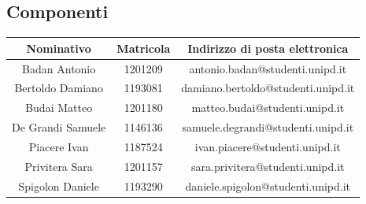 \subsection{Componenti}
\begin{table}[H]
	\centering
	\renewcommand{\arraystretch}{1.5}
	\begin{tabular}{|c|c|c|}
		\hline
		\rowcolor{lighter-grayer}
		Nominativo & Matricola & Indirizzo di posta elettronica \\
		\hline
		Badan Antonio & 1201209 & antonio.badan@studenti.unipd.it\\
		\hline
		Bertoldo Damiano & 1193081 & damiano.bertoldo@studenti.unipd.it \\
		\hline
		Budai Matteo & 1201180 &  matteo.budai@studenti.unipd.it \\
		\hline
		De Grandi Samuele & 1146136 & samuele.degrandi@studenti.unipd.it \\
		\hline
		Piacere Ivan & 1187524 & ivan.piacere@studenti.unipd.it \\
		\hline
		Privitera Sara & 1201157 & sara.privitera@studenti.unipd.it \\
		\hline
		Spigolon Daniele & 1193290 & daniele.spigolon@studenti.unipd.it \\
		\hline
	\end{tabular}
\end{table}